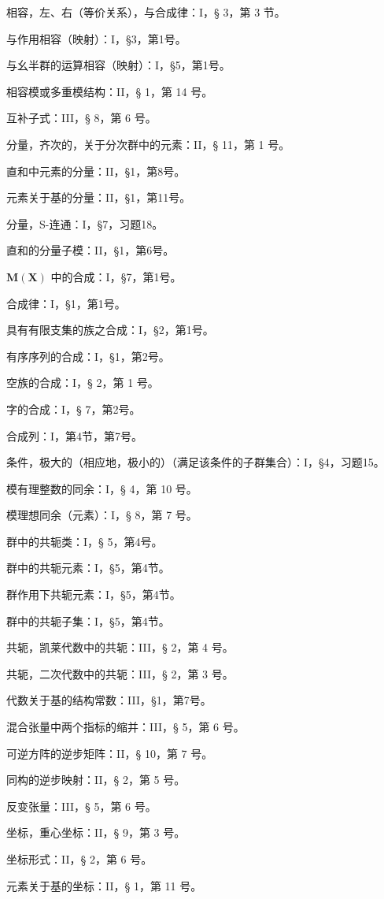 相容，左、右（等价关系），与合成律：I，§ 3，第 3 节。

与作用相容（映射）：I，§3，第1号。

与幺半群的运算相容（映射）：I，§5，第1号。

相容模或多重模结构：II，§ 1，第 14 号。

互补子式：III，§ 8，第 6 号。

分量，齐次的，关于分次群中的元素：II，§ 11，第 1 号。

直和中元素的分量：II，§1，第8号。

元素关于基的分量：II，§1，第11号。

分量，S-连通：I，§7，习题18。

直和的分量子模：II，§1，第6号。

\(\mathbf{M}(\mathbf{X})\) 中的合成：I，§7，第1号。

合成律：I，§1，第1号。

具有有限支集的族之合成：I，§2，第1号。

有序序列的合成：I，§1，第2号。

空族的合成：I，§ 2，第 1 号。

字的合成：I，§ 7，第2号。

合成列：I，第4节，第7号。

条件，极大的（相应地，极小的）（满足该条件的子群集合）：I，§4，习题15。

模有理整数的同余：I，§ 4，第 10 号。

模理想同余（元素）：I，§ 8，第 7 号。

群中的共轭类：I，§ 5，第4号。

群中的共轭元素：I，§5，第4节。

群作用下共轭元素：I，§5，第4节。

群中的共轭子集：I，§5，第4节。

共轭，凯莱代数中的共轭：III，§ 2，第 4 号。

共轭，二次代数中的共轭：III，§ 2，第 3 号。

代数关于基的结构常数：III，§1，第7号。

混合张量中两个指标的缩并：III，§ 5，第 6 号。

可逆方阵的逆步矩阵：II，§ 10，第 7 号。

同构的逆步映射：II，§ 2，第 5 号。

反变张量：III，§ 5，第 6 号。

坐标，重心坐标：II，§ 9，第 3 号。

坐标形式：II，§ 2，第 6 号。

元素关于基的坐标：II，§ 1，第 11 号。

